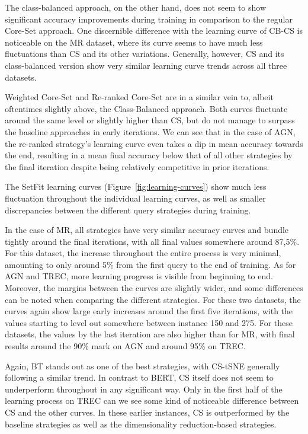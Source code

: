 \documentclass[english,bachelor,ul]{webisthesis} %
\begin{document}
The class-balanced approach, on the other hand, does not seem to show significant accuracy improvements during training in comparison to the regular Core-Set approach. One discernible difference with the learning curve of CB-CS is noticeable on the MR dataset, where its curve seems to have much less fluctuations than CS and its other variations. Generally, however, CS and its class-balanced version show very similar learning curve trends across all three datasets. 

Weighted Core-Set and Re-ranked Core-Set are in a similar vein to, albeit oftentimes slightly above, the Class-Balanced approach. Both curves fluctuate around the same level or slightly higher than CS, but do not manage to surpass the baseline approaches in early iterations. We can see that in the case of AGN, the re-ranked strategy's learning curve even takes a dip in mean accuracy towards the end, resulting in a mean final accuracy below that of all other strategies by the final iteration despite being relatively competitive in prior iterations.

The SetFit learning curves (Figure~\ref{fig:learning-curves}) show much less fluctuation throughout the individual learning curves, as well as smaller discrepancies between the different query strategies during training. 

In the case of MR, all strategies have very similar accuracy curves and bundle tightly around the final iterations, with all final values somewhere around 87,5\%. For this dataset, the increase throughout the entire process is very minimal, amounting to only around 5\% from the first query to the end of training. As for AGN and TREC, more learning progress is visible from beginning to end. Moreover, the margins between the curves are slightly wider, and some differences can be noted when comparing the different strategies. For these two datasets, the curves again show large early increases around the first five iterations, with the values starting to level out somewhere between instance 150 and 275. For these datasets, the values by the last iteration are also higher than for MR, with final results around the 90\% mark on AGN and around 95\% on TREC.

Again, BT stands out as one of the best strategies, with CS-tSNE generally following a similar trend. In contrast to BERT, CS itself does not seem to underperform throughout in any significant way. Only in the first half of the learning process on TREC can we see some kind of noticeable difference between CS and the other curves. In these earlier instances, CS is outperformed by the baseline strategies as well as the dimensionality reduction-based strategies. 
\end{document}
